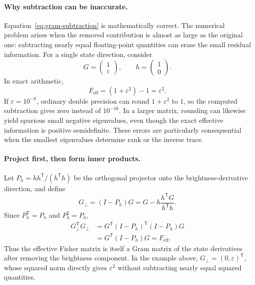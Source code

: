 \documentclass[11pt,a4paper]{article}
\begin{document}
\paragraph{Why subtraction can be inaccurate.}
Equation~\eqref{eq:gram-subtraction} is mathematically correct. The numerical
problem arises when the removed contribution is almost as large as the
original one: subtracting nearly equal floating-point quantities can erase
the small residual information. For a single state direction, consider
\begin{equation}
 G=\begin{pmatrix}1\\\varepsilon\end{pmatrix},\qquad
 h=\begin{pmatrix}1\\0\end{pmatrix}.
\end{equation}
In exact arithmetic,
\begin{equation}
 F_{\mathrm{eff}}=(1+\varepsilon^2)-1=\varepsilon^2.
\end{equation}
If $\varepsilon=10^{-8}$, ordinary double precision can round
$1+\varepsilon^2$ to $1$, so the computed subtraction gives zero instead
of $10^{-16}$. In a larger matrix, rounding can likewise yield spurious
small negative eigenvalues, even though the exact effective information
is positive semidefinite. These errors are particularly consequential
when the smallest eigenvalues determine rank or the inverse trace.

\paragraph{Project first, then form inner products.}
Let $P_h=hh^{\mathsf T}/(h^{\mathsf T}h)$ be the orthogonal projector
onto the brightness-derivative direction, and define
\begin{equation}
 G_\perp=(I-P_h)G
 =G-h\frac{h^{\mathsf T}G}{h^{\mathsf T}h}.
\end{equation}
Since $P_h^{\mathsf T}=P_h$ and $P_h^2=P_h$,
\begin{align}
 G_\perp^{\mathsf T}G_\perp
 &=G^{\mathsf T}(I-P_h)^{\mathsf T}(I-P_h)G\\
 &=G^{\mathsf T}(I-P_h)G
 =F_{\mathrm{eff}}.
\end{align}
Thus the effective Fisher matrix is itself a Gram matrix of the state
derivatives after removing the brightness component. In the example above,
$G_\perp=(0,\varepsilon)^{\mathsf T}$, whose squared norm directly gives
$\varepsilon^2$ without subtracting nearly equal squared quantities.
\end{document}
